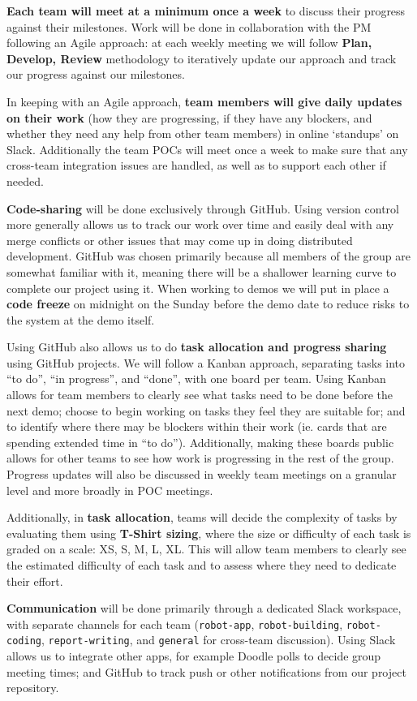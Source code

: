 \documentclass{article}
\begin{document}
{\bf Each team will meet at a minimum once a week} to discuss their progress against their milestones. Work will be done in collaboration with the PM following an Agile approach: at each weekly meeting we will follow {\bf Plan, Develop, Review} methodology to iteratively update our approach and track our progress against our milestones.

In keeping with an Agile approach, {\bf team members will give daily updates on their work} (how they are progressing, if they have any blockers, and whether they need any help from other team members) in online `standups' on Slack. Additionally the team POCs will meet once a week to make sure that any cross-team integration issues are handled, as well as to support each other if needed. 

{\bf Code-sharing} will be done exclusively through GitHub. Using version control more generally allows us to track our work over time and easily deal with any merge conflicts or other issues that may come up in doing distributed development. GitHub was chosen primarily because all members of the group are somewhat familiar with it, meaning there will be a shallower learning curve to complete our project using it. When working to demos we will put in place a {\bf code freeze} on midnight on the Sunday before the demo date to reduce risks to the system at the demo itself. 

Using GitHub also allows us to do {\bf task allocation and progress sharing} using GitHub projects. We will follow a Kanban approach, separating tasks into ``to do'', ``in progress'', and ``done'', with one board per team. Using Kanban allows for team members to clearly see what tasks need to be done before the next demo; choose to begin working on tasks they feel they are suitable for; and to identify where there may be blockers within their work (ie. cards that are spending extended time in ``to do''). Additionally, making these boards public allows for other teams to see how work is progressing in the rest of the group. Progress updates will also be discussed in weekly team meetings on a granular level and more broadly in POC meetings.

Additionally, in {\bf task allocation}, teams will decide the complexity of tasks by evaluating them using {\bf T-Shirt sizing}, where the size or difficulty of each task is graded on a scale: XS, S, M, L, XL. This will allow team members to clearly see the estimated difficulty of each task and to assess where they need to dedicate their effort. 

{\bf Communication} will be done primarily through a dedicated Slack workspace, with separate channels for each team ({\tt robot-app}, {\tt robot-building}, {\tt robot-coding}, {\tt report-writing}, and {\tt general} for cross-team discussion). Using Slack allows us to integrate other apps, for example Doodle polls to decide group meeting times; and GitHub to track push or other notifications from our project repository. 




\end{document}
